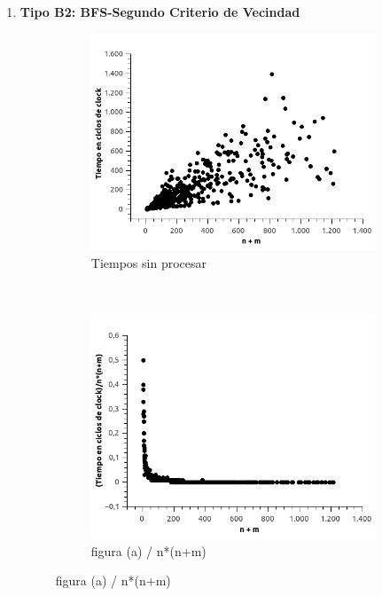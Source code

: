 \begin{enumerate}
\begin{figure}[H]
\end{figure}


\item \textbf{Tipo B2: BFS-Segundo Criterio de Vecindad}

\begin{figure}[H]
        \centering
        \begin{subfigure}[b]{0.5\textwidth}
                \includegraphics[width=\textwidth]{imagenes/ejer4-grafB2-1.jpg}
                \caption{Tiempos sin procesar}
        \end{subfigure}%
        ~ %
        \begin{subfigure}[b]{0.5\textwidth}
                \includegraphics[width=\textwidth]{imagenes/ejer4-grafB2-2.jpg}
                \caption{figura (a) / n*(n+m)}
        \end{subfigure}


\end{figure}
\end{enumerate}
